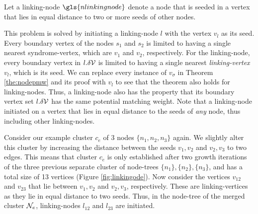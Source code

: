 \begin{definition}\label{def:linkingnode}
  Let a linking-node $\gls{nlinkingnode}$ denote a node that is seeded in a vertex that lies in equal distance to two or more seeds of other nodes. 
\end{definition}

This problem is solved by initiating a linking-node $l$ with the vertex $v_l$ as its seed. Every boundary vertex of the nodes $s_1$ and $s_2$ is limited to having a single nearest syndrome-vertex, which are $v_1$ and $v_2$, respectively. For the linking-node, every boundary vertex in $l.\delta \mathcal{V}$ is limited to having a single nearest \emph{linking-vertex} $v_l$, which is its seed. We can replace every instance of $v_\sigma$ in Theorem \ref{the:nodepmw} and its proof with $v_l$ to see that the theorem also holds for linking-nodes. Thus, a linking-node also has the property that its boundary vertex set $l.\delta \mathcal{V}$ has the same potential matching weight. Note that a linking-node initiated on a vertex that lies in equal distance to the seeds of \emph{any} node, thus including other linking-nodes. 

Consider our example cluster $c_e$ of 3 nodes $\{n_1, n_2, n_3\}$ again. We slightly alter this cluster by increasing the distance between the seeds $v_1, v_2$ and $v_2, v_3$ to two edges. This means that cluster $c_e$ is only established after two growth iterations of the three previous separate cluster of node-trees $\{n_1\}, \{n_2\}, \{n_3\}$, and has a total size of 13 vertices (Figure \ref{fig:linkingode}). Now consider the vertices $v_{12}$ and $v_{23}$ that lie between $v_1, v_2$ and $v_2, v_3$, respectively. These are linking-vertices as they lie in equal distance to two seeds. Thus, in the node-tree of the merged cluster $\mathcal{N}_e$, linking-nodes $l_{12}$ and $l_{23}$ are initiated. 



